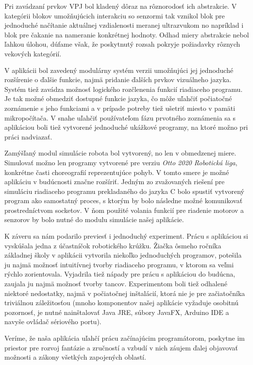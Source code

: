 Pri zavádzaní prvkov VPJ bol kladený dôraz na rôznorodosť ich abstrakcie. V kategórii blokov umožňujúcich interakciu so senzormi tak vznikol blok pre jednoduché načítanie aktuálnej vzdialenosti meranej ultrazvukom no napríklad  i blok pre čakanie na nameranie konkrétnej hodnoty. Odhad miery abstrakcie nebol ľahkou úlohou, dúfame však, že poskytnutý rozsah pokryje požiadavky rôznych vekových kategórií.

V aplikácii bol zavedený modulárny systém verzii  umožňujúci jej jednoduché rozšírenie o ďalšie funkcie, najmä pridanie ďalších prvkov vizuálneho  jazyka. Systém tiež zavádza možnosť logického rozčlenenia funkcií riadiaceho programu. Je tak možné obmedziť dostupné funkcie jazyka, čo môže uľahčiť počiatočné zoznámenie s jeho funkciami a v prípade potreby tiež ušetriť miesto v pamäti mikropočítača. V snahe uľahčiť používateľom fázu prvotného zoznámenia sa s aplikáciou boli tiež vytvorené jednoduché ukážkové programy, na ktoré možno pri práci nadviazať.

Zamýšľaný modul simulácie robota bol vytvorený, no len v obmedzenej miere. Simulovať možno len programy vytvorené pre verziu \textit{Otto 2020 Robotická liga}, konkrétne časti choreografií reprezentujúce pohyb. V tomto smere je možné aplikáciu v budúcnosti značne rozšíriť. Jedným zo zvažovaných riešení pre simuláciu riadiaceho programu prekladaného do jazyka C bolo spustiť vytvorený program ako samostatný proces, s ktorým by bolo následne možné komunikovať prostredníctvom socketov. V ňom použité volania funkcií pre riadenie motorov a senzorov by bolo nutné  do modulu simulácie našej aplikácie.

K záveru sa nám podarilo previesť i jednoduchý experiment. Prácu s aplikáciou si vyskúšala jedna z účastníčok robotického krúžku. Žiačka ôsmeho ročníka základnej školy v aplikácii vytvorila niekoľko jednoduchých programov, potešila ju najmä možnosť intuitívnej tvorby riadiaceho programu, v ktorom sa veľmi rýchlo zorientovala. Vyjadrila tiež nápady pre prácu s aplikáciou do budúcna, zaujala ju najmä možnosť tvorby tancov. Experimentom boli tiež odhalené niektoré nedostatky, najmä v počiatočnej inštalácií, ktorá nie je pre začiatočníka triviálnou záležitosťou (mnoho komponentov našej aplikácie vyžaduje osobitnú pozornosť, je nutné nainštalovať Java JRE, súbory JavaFX, Arduino IDE a navyše ovládač sériového portu).

Veríme, že naša aplikácia uľahčí prácu začínajúcim programátorom, poskytne im priestor pre rozvoj fantázie a zručností a vzbudí v nich záujem ďalej objavovať možnosti a zákony všetkých zapojených oblastí.
